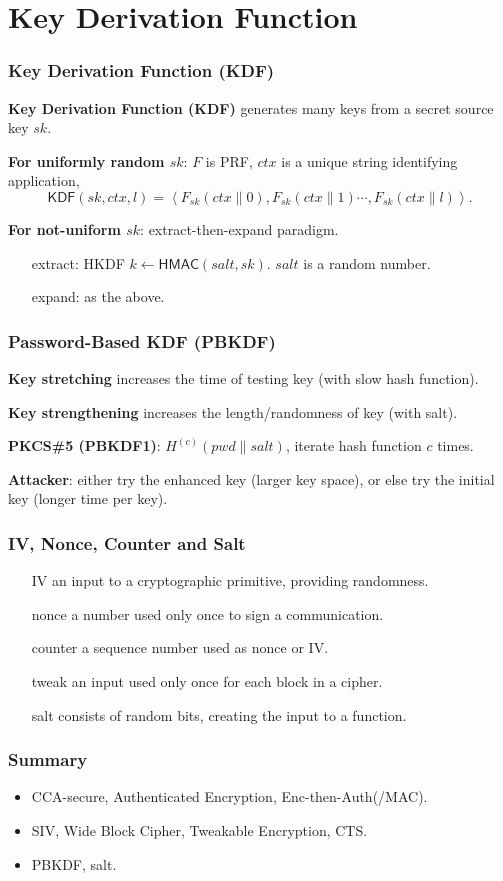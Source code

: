\section{Key Derivation Function}
\begin{frame}\frametitle{Key Derivation Function (KDF)}
\textbf{Key Derivation Function (KDF)} generates many keys from a secret source key $sk$.
\newline

\textbf{For uniformly random $sk$}: $F$ is PRF, $ctx$ is a unique string identifying application,
\[\mathsf{KDF}(sk,ctx,l) = \left<F_{sk}(ctx\|0),F_{sk}(ctx\|1)\cdots,F_{sk}(ctx\|l)\right>.\]

\textbf{For not-uniform $sk$}: extract-then-expand paradigm.\\
\begin{itemize}
\item[extract:] HKDF $k \gets \mathsf{HMAC}(salt,sk)$. $salt$ is a random number.
\item[expand:] as the above.
\end{itemize}
\end{frame}
\begin{frame}\frametitle{ Password-Based KDF (PBKDF)}
\textbf{Key stretching} increases the time of testing key (with slow hash function).
\newline

\textbf{Key strengthening} increases the length/randomness of key (with salt).
\newline

\textbf{PKCS\#5 (PBKDF1)}: $H^{(c)}(pwd\|salt)$, iterate hash function $c$ times.
\newline

\textbf{Attacker}: either try the enhanced key (larger key space), or else try the initial key (longer time per key).
\end{frame}
\begin{frame}\frametitle{IV, Nonce, Counter and Salt}
\begin{itemize}
\item[IV] an input to a cryptographic primitive, providing randomness. 
\item[nonce] a number used only once to sign a communication.
\item[counter] a sequence number used as nonce or IV.
\item[tweak] an input used only once for each block in a cipher.
\item[salt] consists of random bits, creating the input to a function. 
\end{itemize}
\end{frame}
\begin{frame}\frametitle{Summary}
\begin{itemize}
\item CCA-secure, Authenticated Encryption, Enc-then-Auth(/MAC).
\item SIV, Wide Block Cipher, Tweakable Encryption, CTS.
\item PBKDF, salt.
\end{itemize}
\end{frame}





